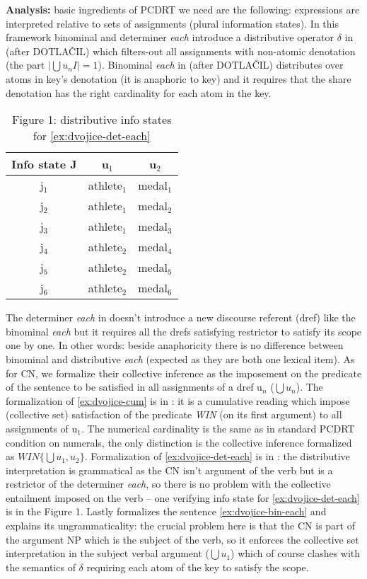 \documentclass[12pt, a4paper]{scrartcl}
\begin{document}
\newpage
\normalsize

\textbf{Analysis:} basic ingredients of PCDRT we need are the following: expressions are interpreted relative to sets of assignments (plural information states). In this framework binominal and determiner \textit{each} introduce a distributive operator $\delta$ in \Next[a] (after DOTLAČIL) which filters-out all assignments with non-atomic denotation (the part $\mid \bigcup u_nI\mid = 1$). Binominal \textit{each} in \Next[b] (after DOTLAČIL) distributes over atoms in key's denotation (it is anaphoric to key) and it requires that the share denotation has the right cardinality for each atom in the key.

\begin{wraptable}{l}{0.37\linewidth}
\begin{tabular}{|c|c|c|}
\hline 
Info state J & u$_1$ & u$_2$ \\ 
\hline 
j$_1$ & athlete$_1$ & medal$_1$ \\ 
\hline 
j$_2$ & athlete$_1$ & medal$_2$ \\ 
\hline 
j$_3$ & athlete$_1$ & medal$_3$ \\ 
\hline 
j$_4$ & athlete$_2$ & medal$_4$ \\ 
\hline 
j$_5$ & athlete$_2$ & medal$_5$ \\ 
\hline 
j$_6$ & athlete$_2$ & medal$_6$ \\ 
\hline 
\end{tabular} 
\caption{Figure 1: distributive info states for \ref{ex:dvojice-det-each}}
\end{wraptable}
The determiner \textit{each} in \Next[c] doesn't introduce a new discourse referent (dref) like the binominal \textit{each} but it requires all the drefs satisfying restrictor to satisfy its scope one by one. In other words: beside anaphoricity there is no difference between binominal and distributive \textit{each} (expected as they are both one lexical item). As for CN, we formalize their collective inference as the imposement on the predicate of the sentence to be satisfied in all assignments of a dref u$_n$ ($\bigcup u_n$). The formalization of \ref{ex:dvojice-cum} is in \NNext[a]: it is a cumulative reading which impose (collective set) satisfaction of the predicate \textit{WIN} (on its first argument) to all assignments of u$_1$. The numerical cardinality is the same as in standard PCDRT condition on numerals, the only distinction is the collective inference formalized as $WIN\{\bigcup u_1,u_2\}$. Formalization of \ref{ex:dvojice-det-each} is in \NNext[b]: the distributive interpretation is grammatical as the CN isn't argument of the verb but is a restrictor of the determiner \textit{each}, so there is no problem with the collective entailment imposed on the verb -- one verifying info state for \ref{ex:dvojice-det-each} is in the Figure 1. Lastly \NNext[c] formalizes the sentence \ref{ex:dvojice-bin-each} and explains its ungrammaticality: the crucial problem here is that the CN is part of the argument NP which is the subject of the verb, so it enforces the collective set interpretation in the subject verbal argument ($\bigcup u_1$) which of course clashes with the semantics of $\delta$ requiring each atom of the key to satisfy the scope. 
\end{document}
